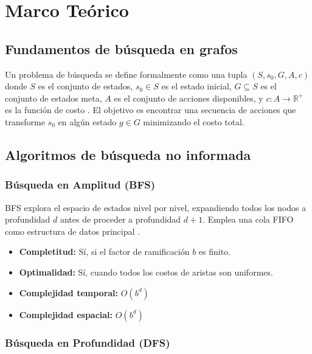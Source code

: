 \section{Marco Teórico}

\subsection{Fundamentos de búsqueda en grafos}

Un problema de búsqueda se define formalmente como una tupla $(S, s_0, G, A, c)$ donde $S$ es el conjunto de estados, $s_0 \in S$ es el estado inicial, $G \subseteq S$ es el conjunto de estados meta, $A$ es el conjunto de acciones disponibles, y $c: A \rightarrow \mathbb{R}^+$ es la función de costo \cite{russell2021artificial}. El objetivo es encontrar una secuencia de acciones que transforme $s_0$ en algún estado $g \in G$ minimizando el costo total.

\subsection{Algoritmos de búsqueda no informada}

\subsubsection{Búsqueda en Amplitud (BFS)}

BFS explora el espacio de estados nivel por nivel, expandiendo todos los nodos a profundidad $d$ antes de proceder a profundidad $d+1$. Emplea una cola FIFO como estructura de datos principal \cite{cormen2022introduction}.

\begin{itemize}
    \item \textbf{Completitud:} Sí, si el factor de ramificación $b$ es finito.
    \item \textbf{Optimalidad:} Sí, cuando todos los costos de aristas son uniformes.
    \item \textbf{Complejidad temporal:} $O(b^d)$
    \item \textbf{Complejidad espacial:} $O(b^d)$
\end{itemize}

\subsubsection{Búsqueda en Profundidad (DFS)}

